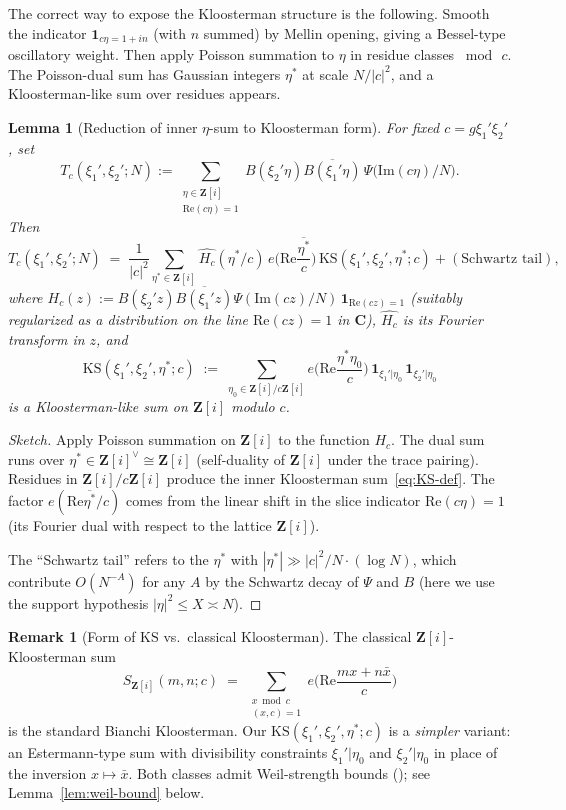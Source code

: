 \documentclass[11pt]{article}
\newtheorem{lemma}[theorem]{Lemma}
\theoremstyle{definition}
\newtheorem{remark}[theorem]{Remark}
\newcommand{\Z}{\mathbf{Z}}
\newcommand{\C}{\mathbf{C}}
\newcommand{\Zi}{\Z[i]}
\renewcommand{\Re}{\mathrm{Re}}
\renewcommand{\Im}{\mathrm{Im}}
\newcommand{\KS}{\mathrm{KS}}
\begin{document}
The correct way to expose the Kloosterman structure is the following. Smooth the indicator $\mathbf{1}_{c\eta=1+in}$ (with $n$ summed) by Mellin opening, giving a Bessel-type oscillatory weight. Then apply Poisson summation to $\eta$ in residue classes $\bmod\,c$. The Poisson-dual sum has Gaussian integers $\eta^*$ at scale $N/|c|^2$, and a Kloosterman-like sum over residues appears.

\begin{lemma}[Reduction of inner $\eta$-sum to Kloosterman form]\label{lem:eta-poisson}
For fixed $c=g\xi_1'\xi_2'$, set
\[
T_c(\xi_1',\xi_2';N):=\sum_{\substack{\eta\in\Zi\\ \Re(c\eta)=1}}B(\xi_2'\eta)\overline{B(\xi_1'\eta)}\,\Psi\bigl(\Im(c\eta)/N\bigr).
\]
Then
\[
T_c(\xi_1',\xi_2';N)\;=\;\frac{1}{|c|^2}\sum_{\eta^*\in\Zi}\widehat{H_c}(\eta^*/c)\,e\!\Big(\Re\frac{\overline{\eta^*}}{c}\Big)\,\KS(\xi_1',\xi_2',\eta^*;c)+(\text{Schwartz tail}),
\]
where $H_c(z):=B(\xi_2'z)\overline{B(\xi_1'z)}\Psi(\Im(cz)/N)\,\mathbf{1}_{\Re(cz)=1}$ (suitably regularized as a distribution on the line $\Re(cz)=1$ in $\C$), $\widehat{H_c}$ is its Fourier transform in $z$, and
\begin{equation}\label{eq:KS-def}
\KS(\xi_1',\xi_2',\eta^*;c)\;:=\;\sum_{\eta_0\in\Zi/c\Zi}e\!\Big(\Re\frac{\eta^*\eta_0}{c}\Big)\,\mathbf{1}_{\xi_1'|\eta_0}\,\mathbf{1}_{\xi_2'|\eta_0}
\end{equation}
is a Kloosterman-like sum on $\Zi$ modulo $c$.
\end{lemma}

\begin{proof}[Sketch]
Apply Poisson summation on $\Zi$ to the function $H_c$. The dual sum runs over $\eta^*\in\Zi^\vee\cong\Zi$ (self-duality of $\Zi$ under the trace pairing). Residues in $\Zi/c\Zi$ produce the inner Kloosterman sum~\eqref{eq:KS-def}. The factor $e(\Re\overline{\eta^*}/c)$ comes from the linear shift in the slice indicator $\Re(c\eta)=1$ (its Fourier dual with respect to the lattice $\Zi$).

The ``Schwartz tail'' refers to the $\eta^*$ with $|\eta^*|\gg|c|^2/N\cdot(\log N)$, which contribute $O(N^{-A})$ for any $A$ by the Schwartz decay of $\Psi$ and $B$ (here we use the support hypothesis $|\eta|^2\le X\asymp N$).
\end{proof}

\begin{remark}[Form of $\KS$ vs.\ classical Kloosterman]\label{rem:KS-form}
The classical $\Zi$-Kloosterman sum
\[
S_{\Zi}(m,n;c)\;=\;\sum_{\substack{x\bmod c\\(x,c)=1}}e\!\Big(\Re\frac{mx+n\bar x}{c}\Big)
\]
is the standard Bianchi Kloosterman. Our $\KS(\xi_1',\xi_2',\eta^*;c)$ is a \emph{simpler} variant: an Estermann-type sum with divisibility constraints $\xi_1'|\eta_0$ and $\xi_2'|\eta_0$ in place of the inversion $x\mapsto\bar x$. Both classes admit Weil-strength bounds (\cite{LG,BMot}); see Lemma~\ref{lem:weil-bound} below.
\end{remark}
\end{document}
